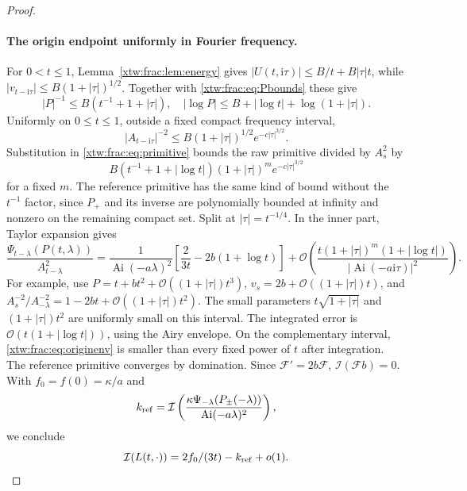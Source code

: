 \documentclass[11pt]{article}
\theoremstyle{remark}\newtheorem{remark}[theorem]{Remark}
\newcommand{\OO}{\mathcal O}
\newcommand{\Ai}{\operatorname{Ai}}
\newcommand{\ii}{\mathrm i}
\newcommand{\FF}{\mathcal F}
\newcommand{\inv}{\mathcal I}
\begin{document}
\begin{proof}
\paragraph{The origin endpoint uniformly in Fourier frequency.}
For $0<t\le1$, Lemma~\ref{xtw:frac:lem:energy} gives
$|U(t,\ii\tau)|\le B/t+B|\tau|t$, while
$|v_{t-\ii\tau}|\le B(1+|\tau|)^{1/2}$.
Together with \eqref{xtw:frac:eq:Pbounds} these give
\[
 |P|^{-1}\le B(t^{-1}+1+|\tau|),\quad
 |\log P|\le B+|\log t|+\log(1+|\tau|).
\]
Uniformly on $0\le t\le1$, outside a fixed compact frequency interval,
\[
 |A_{t-\ii\tau}|^{-2}\le
 B(1+|\tau|)^{1/2}e^{-c|\tau|^{3/2}}.
\]
Substitution in \eqref{xtw:frac:eq:primitive} bounds the raw primitive divided
by $A_s^2$ by
\begin{equation}\label{xtw:frac:eq:originenv}
 B(t^{-1}+1+|\log t|)(1+|\tau|)^m e^{-c|\tau|^{3/2}}
\end{equation}
for a fixed $m$. The reference primitive has the same kind of bound
without the $t^{-1}$ factor, since $P_+$ and its inverse are polynomially
bounded at infinity and nonzero on the remaining compact set.
Split at $|\tau|=t^{-1/4}$. In the inner part, Taylor expansion gives
\begin{equation}\label{xtw:frac:eq:originexp}
 \frac{\Psi_{t-\lambda}(P(t,\lambda))}{A_{t-\lambda}^2}
 =\frac1{\Ai(-a\lambda)^2}
     \left[\frac2{3t}-2b(1+\log t)\right]
 +\OO\left(\frac{t(1+|\tau|)^m(1+|\log t|)}{|\Ai(-a\ii\tau)|^2}\right).
\end{equation}
For example, use $P=t+bt^2+\OO((1+|\tau|)t^3)$,
$v_s=2b+\OO((1+|\tau|)t)$, and
$A_s^{-2}/A_{-\lambda}^{-2}=1-2bt+\OO((1+|\tau|)t^2)$.
The small parameters $t\sqrt{1+|\tau|}$ and $(1+|\tau|)t^2$
are uniformly small on this interval. The integrated error is
$\OO(t(1+|\log t|))$, using the Airy envelope. On the complementary
interval, \eqref{xtw:frac:eq:originenv} is smaller than every fixed power of $t$
after integration. The reference primitive converges by domination.
Since $\FF'=2b\FF$, $\inv(\FF b)=0$. With $f_0=f(0)=\kappa/a$ and
\[
 k_{\rm ref}=\inv\left(
       \frac{\kappa\Psi_{-\lambda}(P_\pm(-\lambda))}{\Ai(-a\lambda)^2}
                         \right),
\]
we conclude
\begin{equation}\label{xtw:frac:eq:originlimit}
 \inv(L(t,\cdot))=2f_0/(3t)-k_{\rm ref}+o(1).
\end{equation}


\end{proof}
\end{document}

